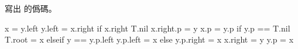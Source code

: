 \startEXERCISE
寫出  的僞碼。
\stopEXERCISE

\startANSWER
{}
\startCLRSCODE
x = y.left
y.left = x.right
if x.right \ne T.nil
	x.right.p = y
x.p = y.p
if y.p == T.nil
	T.root = x
elseif y == y.p.left
	y.p.left = x
else
	y.p.right = x
x.right = y
y.p = x
\stopCLRSCODE
\stopANSWER
